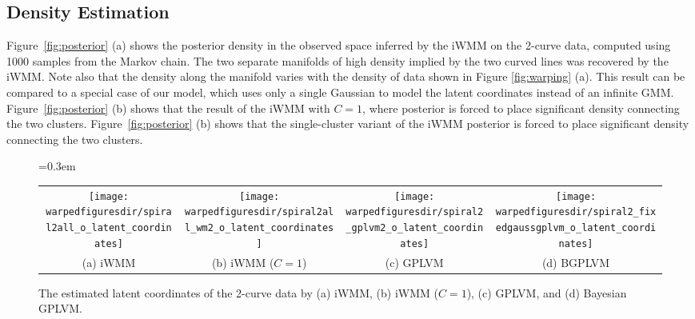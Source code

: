 \subsection{Density Estimation}
Figure~\ref{fig:posterior} (a) shows the posterior density in the observed space inferred by the iWMM on the 2-curve data, computed using 1000 samples from the Markov chain.
The two separate manifolds of high density implied by the two curved lines was recovered by the iWMM.  
Note also that the density along the manifold varies with the density of data shown in Figure \ref{fig:warping} (a).  
%
This result can be compared to a special case of our model, which uses only a single Gaussian to model the latent coordinates instead of an infinite GMM.
Figure~\ref{fig:posterior} (b) shows that the result of the iWMM with $C=1$,
where posterior is forced to place significant density 
connecting the two clusters.
Figure~\ref{fig:posterior} (b) shows that the single-cluster variant of the iWMM posterior is forced to place significant density connecting the two clusters.


\begin{figure*}%
\centering
{\tabcolsep=0.3em
\begin{tabular}{cccc}
\fbox{\texttt{[image: \\warpedfiguresdir/spiral2all\_o\_latent\_coordinates]}} &
\fbox{\texttt{[image: \\warpedfiguresdir/spiral2all\_wm2\_o\_latent\_coordinates]}} &
\fbox{\texttt{[image: \\warpedfiguresdir/spiral2\_gplvm2\_o\_latent\_coordinates]}} &
\fbox{\texttt{[image: \\warpedfiguresdir/spiral2\_fixedgaussgplvm\_o\_latent\_coordinates]}}\\
(a) iWMM & (b) iWMM ($C=1$) &
(c) GPLVM & (d) BGPLVM \\
\end{tabular}}
\caption{The estimated latent coordinates of the 2-curve data by
(a) iWMM, (b) iWMM ($C=1$), (c) GPLVM, and (d) Bayesian GPLVM.}
\label{fig:latent}
\end{figure*}

